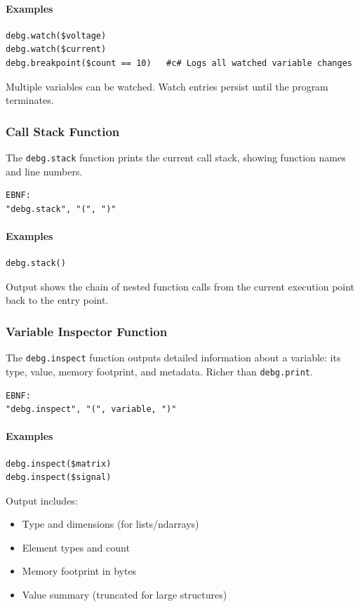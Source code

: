 \paragraph{Examples}
\begin{verbatim}
debg.watch($voltage)
debg.watch($current)
debg.breakpoint($count == 10)   #c# Logs all watched variable changes
\end{verbatim}

Multiple variables can be watched. Watch entries persist until the program terminates.

\subsubsection{Call Stack Function}
The \texttt{debg.stack} function prints the current call stack, showing function names and line numbers.
\begin{verbatim}
EBNF:
"debg.stack", "(", ")"
\end{verbatim}

\paragraph{Examples}
\begin{verbatim}
debg.stack()
\end{verbatim}

Output shows the chain of nested function calls from the current execution point back to the entry point.

\subsubsection{Variable Inspector Function}
The \texttt{debg.inspect} function outputs detailed information about a variable: its type, value, memory footprint, and metadata. Richer than \texttt{debg.print}.
\begin{verbatim}
EBNF:
"debg.inspect", "(", variable, ")"
\end{verbatim}

\paragraph{Examples}
\begin{verbatim}
debg.inspect($matrix)
debg.inspect($signal)
\end{verbatim}

Output includes:
\begin{itemize}
\item Type and dimensions (for lists/ndarrays)
\item Element types and count
\item Memory footprint in bytes
\item Value summary (truncated for large structures)
\end{itemize}

